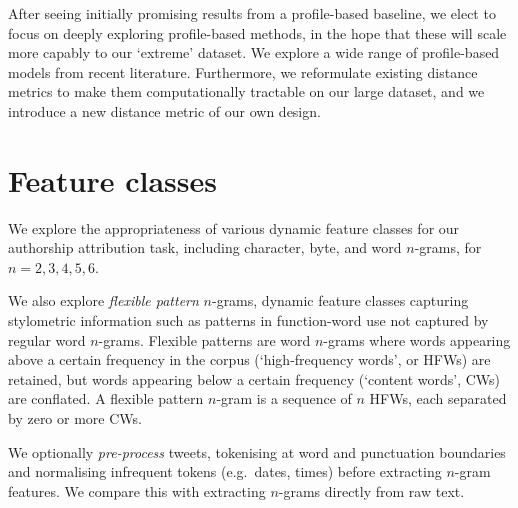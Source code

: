 \documentclass[twocolumn,10pt]{article}
\begin{document}
After seeing initially promising results from a profile-based
baseline,
we elect to focus on deeply exploring profile-based
methods, in the hope that these will scale more capably to our
`extreme' dataset.
We explore a wide range of profile-based models from recent
literature.
Furthermore, we reformulate existing distance metrics
to make them computationally tractable on our large dataset,
and we introduce a new distance metric of our own design.



\section{Feature classes}
We explore the appropriateness of various dynamic feature
classes for our authorship attribution task, including
character, byte, and word $n$-grams, for $n = 2,3,4,5,6$.

We also explore \emph{flexible pattern} $n$-grams, dynamic
feature classes capturing stylometric information such as
patterns in function-word use not captured by regular word 
$n$-grams\supercite{schwartz2013authorship}.
Flexible patterns are word $n$-grams where words appearing
above a certain frequency in the corpus (`high-frequency words',
or HFWs) are retained, but words appearing below a certain
frequency (`content words', CWs) are conflated. A flexible
pattern $n$-gram is a sequence of $n$ HFWs, each separated
by zero or more CWs.


We optionally \emph{pre-process} tweets,
tokenising at word and punctuation boundaries and
normalising infrequent tokens (e.g.~dates, times)
before extracting $n$-gram features.
We compare this with extracting $n$-grams directly from
raw text.
\end{document}
